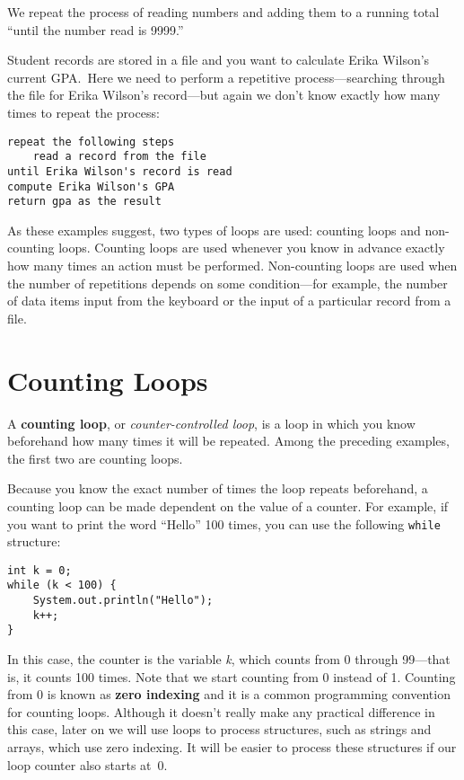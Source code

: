 \begin{BL}
\noindent We repeat the process of reading numbers and
adding them to a running total ``until the number read is 9999.''

\item  Student records are stored in a file and you want to
calculate Erika Wilson's current GPA.~Here we need to perform a
repetitive process---searching through the file for Erika Wilson's
record---but again we don't know exactly how many times to repeat
the process:

\begin{jjjlisting}
\begin{lstlisting}[stringstyle=\color{black}]
repeat the following steps
    read a record from the file
until Erika Wilson's record is read
compute Erika Wilson's GPA
return gpa as the result
\end{lstlisting}
\end{jjjlisting}
\end{BL}

\noindent As these examples suggest, two types of loops are used:
counting loops and non-counting loops.  Counting loops are used
whenever you know in advance exactly how many times an action must be
performed.  Non-counting loops are used when the number of repetitions
depends on some condition---for example, the number of data items
input from the keyboard or the input of a particular record from a
file.

\section{Counting Loops}
\label{counting-loops}
\noindent A {\bf counting loop}, or {\it counter-controlled loop}, is
a loop in which you know beforehand how many times it will be
repeated. Among the preceding examples, the first two are counting
loops.

Because you know the exact number of times the loop repeats 
 beforehand, a counting loop can be made dependent on the value of a
counter. For example, if you want to print the word ``Hello'' 100
times, you can use the following {\tt while}  structure:

\begin{jjjlisting}
\begin{lstlisting}
int k = 0;
while (k < 100) {
    System.out.println("Hello");
    k++;
}
\end{lstlisting}
\end{jjjlisting}

\noindent In this case, the counter is the variable {\it k}, which counts
from 0 through 99---that is, it counts 100 times.  Note that we start
counting from 0 instead of 1. Counting from 0 is known as {\bf zero
indexing} and it is a common programming convention for counting
loops.  Although it doesn't really make any practical difference in
this case, later on we will use loops to process
structures, such as strings and arrays, which use zero indexing. It
will be easier to process these structures if our loop counter also
starts at~0.

